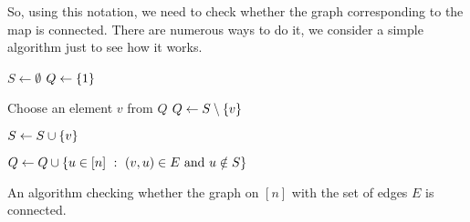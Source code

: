 So, using this notation, we need to check whether the graph corresponding to
the map is connected. There are numerous ways to do it, we consider a simple
algorithm just to see how it works.
\begin{algorithm}
  \begin{algorithmic}[1]
      \State $S \gets \emptyset$
      \State $Q \gets \set{1}$

      \label{algorithm:connectivity-cycle}
        \State Choose an element $v$ from $Q$
        \State $Q \gets S \setminus \set{v}$

        \State $S \gets S \cup \set{v}$

        \State $Q \gets Q \cup
          \set[{(v, u) \in E \text{ and } u \notin S}]{u \in \range{n}}$
      \EndWhile
      \label{line:connectivity-last}
      \State {}
    \EndFunction
  \end{algorithmic}
  \caption{An algorithm checking whether the graph on $[n]$ with the set of
  edges $E$ is connected.}
  \label{algorithm:connectivity}
\end{algorithm}

